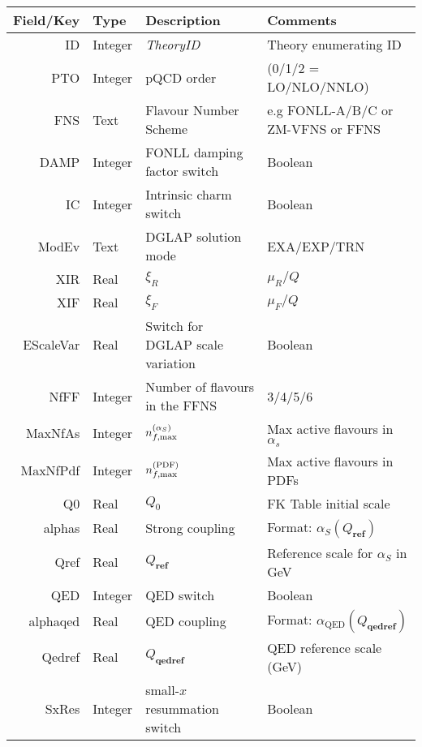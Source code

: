 \documentclass[11pt]{article}
\begin{document}
\begin{table}[htp]
\begin{center}
\begin{tabular}{|r|l|l|p{50mm}|}
\hline
Field/Key   & Type    & Description                    & Comments \\
\hline\hline
  ID        & Integer & \it TheoryID                   &  Theory enumerating ID \\
  PTO       & Integer & pQCD order                     & (0/1/2 = LO/NLO/NNLO) \\
  FNS       & Text    & Flavour Number Scheme          & e.g FONLL-A/B/C \newline or ZM-VFNS or FFNS \\
  DAMP      & Integer & FONLL damping factor switch    & Boolean \\
  IC        & Integer & Intrinsic charm switch         & Boolean \\
  ModEv     & Text    & DGLAP solution mode            & EXA/EXP/TRN \\
  XIR       & Real    & $\xi_R$                        & $\mu_R/Q$ \\
  XIF       & Real    & $\xi_F$                        & $\mu_F/Q$ \\
  EScaleVar & Real    & Switch for DGLAP scale variation & Boolean \\
  NfFF      & Integer & Number of flavours in the FFNS & 3/4/5/6 \\
  MaxNfAs   & Integer & $n_{f,\rm max}^{(\alpha_S)}$   & Max active flavours in $\alpha_s$ \\
  MaxNfPdf  & Integer & $n_{f,\rm max}^{(\rm PDF)}$    & Max active flavours in PDFs \\
  Q0        & Real    & $Q_0$                          & FK Table initial scale \\
  alphas    & Real    & Strong coupling                & Format: $\alpha_S(Q_{\textbf{ref}})$ \\
  Qref      & Real    & $Q_{\textbf{ref}}$             & Reference scale for $\alpha_S$ in GeV \\
  QED       & Integer & QED switch                     & Boolean \\
  alphaqed  & Real    & QED coupling                   & Format: $\alpha_{\mathrm{QED}}(Q_{\textbf{qedref}})$ \\
  Qedref    & Real    & $Q_{\textbf{qedref}}$          & QED reference scale (GeV) \\
  SxRes     & Integer & small-$x$ resummation switch   & Boolean \\

\end{tabular}
\end{center}
\end{table}
\end{document}
